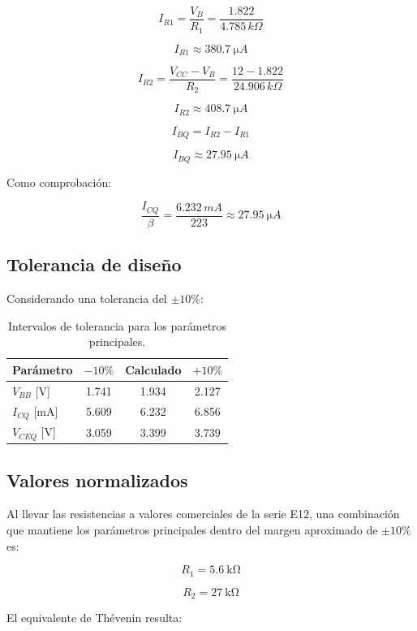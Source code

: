 \documentclass[a4paper,12pt]{article}
\begin{document}
\[
I_{R1}
=
\frac{V_B}{R_1}
=
\frac{1.822}{4.785\,k\Omega}
\]

\[
\boxed{I_{R1}\approx\SI{380.7}{\micro A}}
\]

\[
I_{R2}
=
\frac{V_{CC}-V_B}{R_2}
=
\frac{12-1.822}{24.906\,k\Omega}
\]

\[
\boxed{I_{R2}\approx\SI{408.7}{\micro A}}
\]

\[
I_{BQ}
=
I_{R2}-I_{R1}
\]

\[
\boxed{I_{BQ}\approx\SI{27.95}{\micro A}}
\]

Como comprobación:

\[
\frac{I_{CQ}}{\beta}
=
\frac{6.232\,mA}{223}
\approx
\SI{27.95}{\micro A}
\]

\subsection{Tolerancia de diseño}

Considerando una tolerancia del $\pm10\%$:

\begin{table}[H]
\centering
\caption{Intervalos de tolerancia para los parámetros principales.}
\begin{tabular}{lccc}
\toprule
Parámetro & $-10\%$ & Calculado & $+10\%$\\
\midrule
$V_{BB}$ [V] & 1.741 & 1.934 & 2.127\\
$I_{CQ}$ [mA] & 5.609 & 6.232 & 6.856\\
$V_{CEQ}$ [V] & 3.059 & 3.399 & 3.739\\
\bottomrule
\end{tabular}
\end{table}

\subsection{Valores normalizados}

Al llevar las resistencias a valores comerciales de la serie E12, una combinación que mantiene
los parámetros principales dentro del margen aproximado de $\pm10\%$ es:

\[
\boxed{R_1=\SI{5.6}{\kilo\ohm}}
\]

\[
\boxed{R_2=\SI{27}{\kilo\ohm}}
\]

El equivalente de Thévenin resulta:
\end{document}

